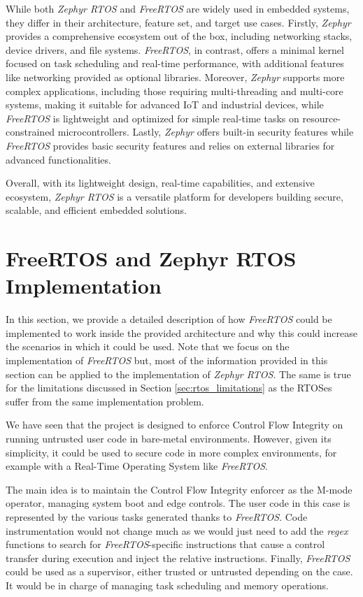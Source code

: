 While both \textit{Zephyr RTOS} and \textit{FreeRTOS} are widely used in embedded
systems, they differ in their architecture, feature set, and target use cases. Firstly,
\textit{Zephyr} provides a comprehensive ecosystem out of the box, including
networking stacks, device drivers, and file systems. \textit{FreeRTOS}, in contrast,
offers a minimal kernel focused on task scheduling and real-time performance, with
additional features like networking provided as optional libraries. Moreover, \textit{Zephyr}
supports more complex applications, including those requiring multi-threading and
multi-core systems, making it suitable for advanced IoT and industrial devices, while
\textit{FreeRTOS} is lightweight and optimized for simple real-time tasks on
resource-constrained microcontrollers. Lastly, \textit{Zephyr} offers built-in security
features while \textit{FreeRTOS} provides basic security features and relies on
external libraries for advanced functionalities.

Overall, with its lightweight design, real-time capabilities, and extensive ecosystem,
\textit{Zephyr RTOS} is a versatile platform for developers building secure,
scalable, and efficient embedded solutions.

\section{FreeRTOS and Zephyr RTOS Implementation}
\label{sec:rtos_porting}

In this section, we provide a detailed description of how \textit{FreeRTOS}
could be implemented to work inside the provided architecture and why this could
increase the scenarios in which it could be used. Note that we focus on the implementation
of \textit{FreeRTOS} but, most of the information provided in this section can be
applied to the implementation of \textit{Zephyr RTOS}. The same is true for the limitations
discussed in Section \ref{sec:rtos_limitations} as the RTOSes suffer from the same
implementation problem.

We have seen that the project is designed to enforce Control Flow Integrity on running
untrusted user code in bare-metal environments. However, given its simplicity,
it could be used to secure code in more complex environments, for example with a
Real-Time Operating System like \textit{FreeRTOS}.

The main idea is to maintain the Control Flow Integrity enforcer as the M-mode
operator, managing system boot and edge controls. The user code in this case is
represented by the various tasks generated thanks to \textit{FreeRTOS}. Code
instrumentation would not change much as we would just need to add the \textit{regex}
functions to search for \textit{FreeRTOS}-specific instructions that cause a
control transfer during execution and inject the relative instructions. Finally,
\textit{FreeRTOS} could be used as a supervisor, either trusted or untrusted
depending on the case. It would be in charge of managing task scheduling and memory
operations.

